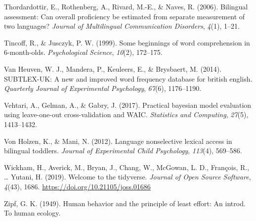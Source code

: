 \documentclass[
  english,
  man,man,floatsintext]{apa6}
\newlength{\cslhangindent}
\newenvironment{CSLReferences}[2] %
 {%
  \setlength{\parindent}{0pt}
  \ifodd #1 \everypar{\setlength{\hangindent}{\cslhangindent}}\ignorespaces\fi
  \ifnum #2 > 0
  \setlength{\parskip}{#2\baselineskip}
  \fi
 }%
 {}
\begin{document}
\begin{CSLReferences}{1}{0}
\leavevmode{}%
Thordardottir, E., Rothenberg, A., Rivard, M.-E., \& Naves, R. (2006). Bilingual assessment: Can overall proficiency be estimated from separate measurement of two languages? \emph{Journal of Multilingual Communication Disorders}, \emph{4}(1), 1--21.

\leavevmode{}%
Tincoff, R., \& Jusczyk, P. W. (1999). Some beginnings of word comprehension in 6-month-olds. \emph{Psychological Science}, \emph{10}(2), 172--175.

\leavevmode{}%
Van Heuven, W. J., Mandera, P., Keuleers, E., \& Brysbaert, M. (2014). SUBTLEX-UK: A new and improved word frequency database for british english. \emph{Quarterly Journal of Experimental Psychology}, \emph{67}(6), 1176--1190.

\leavevmode{}%
Vehtari, A., Gelman, A., \& Gabry, J. (2017). Practical bayesian model evaluation using leave-one-out cross-validation and WAIC. \emph{Statistics and Computing}, \emph{27}(5), 1413--1432.

\leavevmode{}%
Von Holzen, K., \& Mani, N. (2012). Language nonselective lexical access in bilingual toddlers. \emph{Journal of Experimental Child Psychology}, \emph{113}(4), 569--586.

\leavevmode{}%
Wickham, H., Averick, M., Bryan, J., Chang, W., McGowan, L. D., François, R., \ldots{} Yutani, H. (2019). Welcome to the {tidyverse}. \emph{Journal of Open Source Software}, \emph{4}(43), 1686. \url{https://doi.org/10.21105/joss.01686}

\leavevmode{}%
Zipf, G. K. (1949). Human behavior and the principle of least effort: An introd. To human ecology.

\end{CSLReferences}

\endgroup
\end{document}
